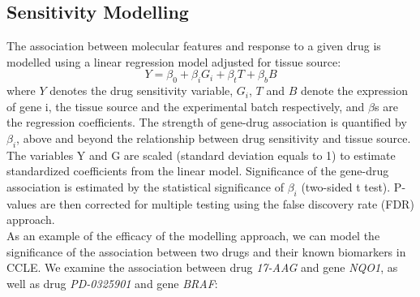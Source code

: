 \documentclass[11pt]{article}
\begin{document}
\subsection{Sensitivity Modelling}
The association between molecular features and response to a given drug is modelled using a linear regression model adjusted for tissue source: 
$$Y = \beta_{0} + \beta_{i}G_i + \beta_{t}T + \beta_{b}B$$
where $Y$ denotes the drug sensitivity variable, $G_i$, $T$ and $B$ denote the expression of gene i, the tissue source and the experimental batch respectively, and $\beta$s are the regression coefficients. The strength of gene-drug association is quantified by $\beta_i$, above and beyond the relationship between drug sensitivity and tissue source. The variables Y and G are scaled (standard deviation equals to 1) to estimate standardized coefficients from the linear model. Significance of the gene-drug association is estimated by the statistical significance of $\beta_i$ (two-sided t test). P-values are then corrected for multiple testing using the false discovery rate (FDR) approach.\\

As an example of the efficacy of the modelling approach, we can model the significance of the association between two drugs and their known biomarkers in CCLE. We examine the association between drug \textit{17-AAG} and gene \textit{NQO1}, as well as drug \textit{PD-0325901} and gene \textit{BRAF}:
\end{document}
